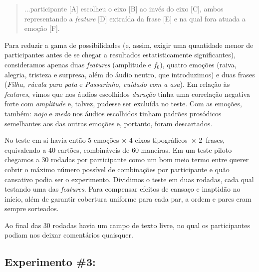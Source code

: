 \documentclass[a4paper]{tufte-handout}
\begin{document}
\begin{quote}
    ...participante [A] escolheu o eixo [B] ao invés do eixo [C], ambos representando a \textit{feature} [D] extraída da frase [E] e na qual fora atuada a emoção [F].
\end{quote}

Para reduzir a gama de possibilidades (e, assim, exigir uma quantidade menor de participantes antes de se chegar a resultados estatisticamente significantes), consideramos apenas duas \textit{features} (amplitude e $f_0$), quatro emoções (raiva, alegria, tristeza e surpresa, além do áudio neutro, que introduzimos) e duas frases (\textit{Filha, rúcula para pata} e \textit{Passarinho, cuidado com a asa}). Em relação às \textit{features}, vimos que nos áudios escolhidos \textit{duração} tinha uma correlação negativa forte com \textit{amplitude} e, talvez, pudesse ser excluída no teste. Com as emoções, também: \textit{nojo} e \textit{medo} nos áudios escolhidos tinham padrões prosódicos semelhantes aos das outras emoções e, portanto, foram descartados.

No teste em si havia então 5 emoções × 4 eixos tipográficos~× 2~frases, equivalendo a 40 cartões, combináveis de 60 maneiras. Em um teste piloto chegamos a 30 rodadas por participante como um bom meio termo entre querer cobrir o máximo número possível de combinações por participante e quão cansativo podia ser o experimento. Dividimos o teste em duas rodadas, cada qual testando uma das \textit{features}. Para compensar efeitos de cansaço e inaptidão no início, além de garantir cobertura uniforme para cada par, a ordem e pares eram sempre sorteados.

Ao final das 30 rodadas havia um campo de texto livre, no qual os participantes podiam nos deixar comentários quaisquer.

\subsection{Experimento \#3: }\label{sec:met_exp_3}
\end{document}
